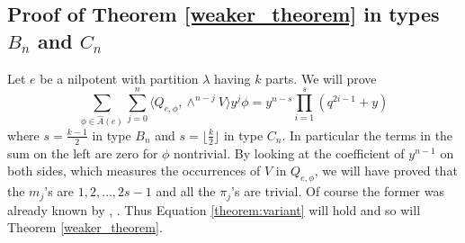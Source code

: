 \documentclass[10pt]{amsart}
\newcommand{\g}{\mathfrak{g}}
\newcommand{\complex}{\mathbf C}
\newcommand{\levi}{\mathfrak l}
\newcommand{\ar}{{\hat{A}}(e)}
\newcommand{\flag}{{\mathcal B}}
\theoremstyle{plain}
\newtheorem{proposition}[theorem]{Proposition}
\theoremstyle{definition}
\theoremstyle{remark}
\begin{document}
%
%
%
%
%


\subsection{\texorpdfstring{Proof of Theorem  \ref{weaker_theorem} in types $B_n$ and $C_n$}{Proof in types Bn or Cn}}

Let $e$ be a nilpotent with partition $\lambda$ having $k$ parts.  We will prove 
$$ \sum_{\phi \in \ar} \sum_{j=0}^n \langle Q_{e, \phi}, \wedge^{n-j} V \rangle  y^j \phi =  y^{n-s} \prod_{i=1}^s (q^{2i-1}+ y)$$
where $s = \frac{k-1}{2}$ in type $B_n$
and $s = \lfloor  \frac{k}{2}   \rfloor$ in type $C_n$.   In particular the terms in the sum on the left are zero for $\phi$ nontrivial.
By looking at the coefficient of $y^{n-1}$
on both sides, which measures the occurrences of $V$ in $Q_{e, \phi}$, we will have proved that 
the $m_j$'s are $1, 2, \dots, 2s-1$ and all the $\pi_j$'s are trivial.  Of course the former was already known by  \cite{lehrer-shoji:reflections}, \cite{spaltenstein:reflection}.
Thus Equation \ref{theorem:variant} will hold and so will Theorem \ref{weaker_theorem}.
\end{document}
